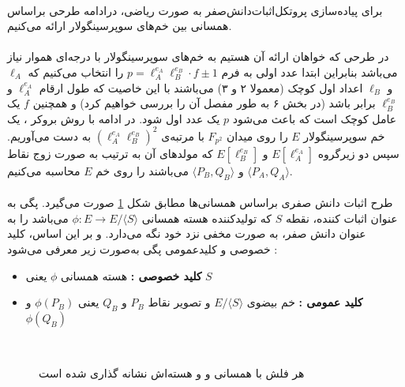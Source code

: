 \\
برای پیاده‌سازی پروتکل‌اثبات‌دانش‌صفر به صورت ریاضی، درادامه طرحی براساس همسانی بین  خم‌های سوپرسینگولار ارائه می‌کنیم.  
\\
\\
در طرحی که خواهان ارائه آن هستیم به خم‌های سوپرسینگولار با درجه‌ای هموار
 نیاز می‌باشد بنابراین ابتدا  عدد اولی به فرم 
$p = \ell_A^{e_A} \ell_B^{e_B} \cdot f \pm 1$
را انتخاب می‌کنیم که 
$\ell_A$
و
$\ell_B$
اعداد اول کوچک (معمولا ۲ و ۳) می‌باشند با این خاصیت که طول ارقام
$\ell_A^{e_A}$
و
$\ell_B^{e_B} $
برابر باشد (در بخش ۶ به طور مفصل آن را بررسی خواهیم کرد) و همچنین  
$f$ %
یک عامل کوچک است که باعث می‌شود 
$p$
یک عدد اول شود. در ادامه ‌با روش بروکر 
\cite{broker@constructing}
، یک خم سوپرسینگولار 
$E$
را روی میدان 
$F_{p^2}$
با مرتبه‌ی 
$(\ell_A^{e_A} \ell_B^{e_B})^2$
 به دست می‌آوریم. سپس دو زیرگروه 
$E[\ell_A^{e_A}]$
و
$E[\ell_B^{e_B}]$ 
که مولدهای آن به ترتیب به صورت زوج نقاط
$ \langle P_A,Q_A \rangle $
و
$ \langle P_B,Q_B \rangle  $
می‌باشند را روی خم 
$E$
محاسبه می‌کنیم.
\\
\\
طرح اثبات دانش صفری براساس همسانی‌ها مطابق شکل 
\ref{fig:zkp}
 صورت می‌گیرد. پگی به عنوان اثبات کننده، نقطه 
$S$
که تولیدکننده هسته همسانی 
$\phi : E \rightarrow E/ \langle S \rangle $
می‌باشد را به عنوان دانش  صفر، به صورت مخفی نزد خود نگه  می‌دارد. 
و بر این اساس، کلید خصوصی و کلیدعمومی پگی به‌صورت زیر معرفی می‌شود :

\begin{itemize}
\item {\textbf{کلید خصوصی :} }
هسته همسانی
$\phi$
یعنی
$S$

\item {\textbf{کلید عمومی :} }
خم بیضوی
$E/ \langle S \rangle$
و تصویر نقاط  
$P_B$ 
و
$Q_B$
یعنی
$\phi(P_B)$
و	
$\phi(Q_B)$	
\end{itemize}~ 
\begin{figure}[H] 
	\begin{center}
		
		
		\caption{
			هر فلش با همسانی و و هسته‌اش نشانه گذاری شده است    
		}
		\label{fig:zkp}
		
	\end{center}
\end{figure}
\vskip 0.5in

